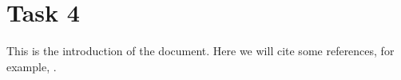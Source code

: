 \section{Task 4}
This is the introduction of the document. Here we will cite some references, for example, \cite{knuth1984texbook}.